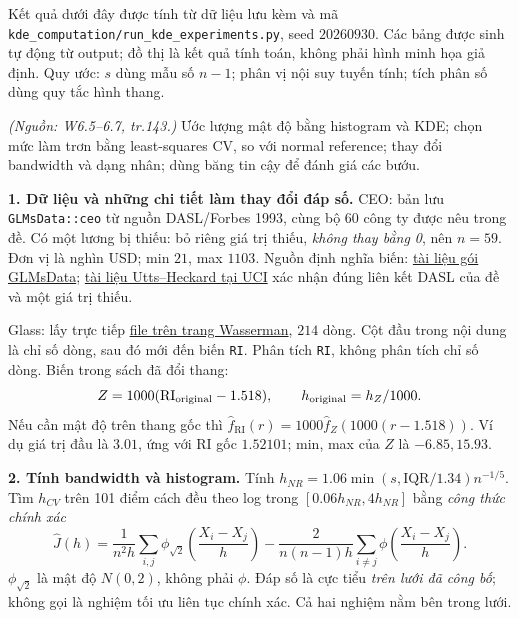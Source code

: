 \noindent Kết quả dưới đây được tính từ dữ liệu lưu kèm và mã
\texttt{kde\_computation/run\_kde\_experiments.py}, seed $20260930$.
Các bảng được sinh tự động từ output; đồ thị là kết quả tính toán, không phải hình minh họa giả định.
Quy ước: $s$ dùng mẫu số $n-1$; phân vị nội suy tuyến tính; tích phân số dùng quy tắc hình thang.

\begin{problem}\label{k:41}
\textit{(Nguồn: W6.5--6.7, tr.143.)} Ước lượng mật độ bằng histogram và KDE; chọn mức làm trơn bằng least-squares CV, so với normal reference; thay đổi bandwidth và dạng nhân; dùng băng tin cậy để đánh giá các bướu.
\end{problem}
\begin{solution}
\textbf{1. Dữ liệu và những chi tiết làm thay đổi đáp số.}
CEO: bản lưu \texttt{GLMsData::ceo} từ nguồn DASL/Forbes 1993, cùng bộ 60 công ty được nêu trong đề. Có một lương bị thiếu: bỏ riêng giá trị thiếu, \emph{không thay bằng 0}, nên $n=59$. Đơn vị là nghìn USD; min $21$, max $1103$.
Nguồn định nghĩa biến: \href{https://search.r-project.org/CRAN/refmans/GLMsData/html/ceo.html}{tài liệu gói GLMsData}; \href{https://ics.uci.edu/~jutts/8/readme.html}{tài liệu Utts--Heckard tại UCI} xác nhận đúng liên kết DASL của đề và một giá trị thiếu.

Glass: lấy trực tiếp \href{https://stat.cmu.edu/~larry/all-of-nonpar/=data/glass.dat}{file trên trang Wasserman}, $214$ dòng. Cột đầu trong nội dung là chỉ số dòng, sau đó mới đến biến \texttt{RI}. Phân tích \texttt{RI}, không phân tích chỉ số dòng. Biến trong sách đã đổi thang:
\[
 Z=1000(\mathrm{RI}_{\rm original}-1.518),\qquad
 h_{\rm original}=h_Z/1000.
\]
Nếu cần mật độ trên thang gốc thì $\widehat f_{\mathrm{RI}}(r)=1000\widehat f_Z(1000(r-1.518))$.
Ví dụ giá trị đầu là $3.01$, ứng với RI gốc $1.52101$; min, max của $Z$ là $-6.85,15.93$.

\textbf{2. Tính bandwidth và histogram.}
Tính $h_{NR}=1.06\min(s,\mathrm{IQR}/1.34)n^{-1/5}$.
Tìm $h_{CV}$ trên 101 điểm cách đều theo log trong $[0.06h_{NR},4h_{NR}]$ bằng \emph{công thức chính xác}
\[
 \widehat J(h)=\frac{1}{n^2h}\sum_{i,j}\phi_{\sqrt2}\!\left(\frac{X_i-X_j}{h}\right)
 -\frac{2}{n(n-1)h}\sum_{i\ne j}\phi\!\left(\frac{X_i-X_j}{h}\right).
\]
$\phi_{\sqrt2}$ là mật độ $N(0,2)$, không phải $\phi$.
Đáp số là cực tiểu \emph{trên lưới đã công bố}; không gọi là nghiệm tối ưu liên tục chính xác.
Cả hai nghiệm nằm bên trong lưới.


\end{solution}
